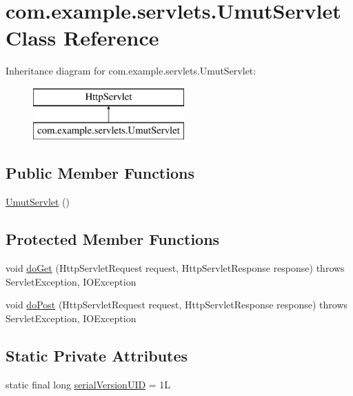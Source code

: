 \hypertarget{classcom_1_1example_1_1servlets_1_1_umut_servlet}{}\section{com.\+example.\+servlets.\+Umut\+Servlet Class Reference}
\label{classcom_1_1example_1_1servlets_1_1_umut_servlet}
Inheritance diagram for com.\+example.\+servlets.\+Umut\+Servlet\+:\begin{figure}[H]
\begin{center}
\leavevmode
\includegraphics[height=2.000000cm]{classcom_1_1example_1_1servlets_1_1_umut_servlet}
\end{center}
\end{figure}
\subsection*{Public Member Functions}
\begin{DoxyCompactItemize}
\item 
\hyperlink{classcom_1_1example_1_1servlets_1_1_umut_servlet_a187d7bf04e87a540c3d2b52c44c14cf3}{Umut\+Servlet} ()
\end{DoxyCompactItemize}
\subsection*{Protected Member Functions}
\begin{DoxyCompactItemize}
\item 
void \hyperlink{classcom_1_1example_1_1servlets_1_1_umut_servlet_a4dba74dc02d5fe491b718022fe0e3298}{do\+Get} (Http\+Servlet\+Request request, Http\+Servlet\+Response response)  throws Servlet\+Exception, I\+O\+Exception 
\item 
void \hyperlink{classcom_1_1example_1_1servlets_1_1_umut_servlet_a10d9e55aee3af4c8023325a534f6b484}{do\+Post} (Http\+Servlet\+Request request, Http\+Servlet\+Response response)  throws Servlet\+Exception, I\+O\+Exception 
\end{DoxyCompactItemize}
\subsection*{Static Private Attributes}
\begin{DoxyCompactItemize}
\item 
static final long \hyperlink{classcom_1_1example_1_1servlets_1_1_umut_servlet_a2ac8210ed285393de2a441e311db1ea5}{serial\+Version\+U\+ID} = 1L
\end{DoxyCompactItemize}


